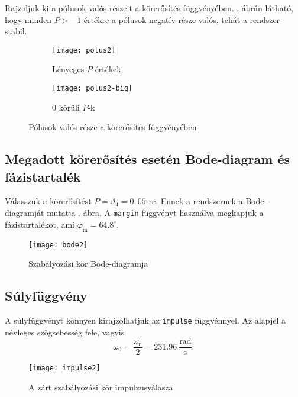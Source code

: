 Rajzoljuk ki a pólusok valós részeit a körerősítés függvényében.
. ábrán látható, hogy minden $P>-1$ értékre a pólusok
negatív része valós, tehát a rendszer stabil.
\begin{figure}[H]
	\centering
	\begin{subfigure}{.49\textwidth}
		\texttt{[image: polus2]}
		\caption{Lényeges $P$ értékek}
	\end{subfigure}
	\begin{subfigure}{.49\textwidth}
		\texttt{[image: polus2-big]}
		\caption{0 körüli $P$-k}
	\end{subfigure}
	\caption{Pólusok valós része a körerősítés függvényében}
	\label{fig:poles2}
\end{figure}


\subsection{Megadott körerősítés esetén Bode-diagram és fázistartalék}

Válasszuk a körerősítést $P=\vartheta_4 = 0,05$-re.
Ennek a rendszernek a Bode-diagramját mutatja . ábra.
A \verb|margin| függvényt használva megkapjuk a fázistartalékot,
ami $\varphi_\text{m}=64.8^\circ$.

\begin{figure}[H]
	\centering
	\texttt{[image: bode2]}
	\caption{Szabályozási kör Bode-diagramja}
	\label{fig:bode2}
\end{figure}


\subsection{Súlyfüggvény}

A súlyfüggvényt könnyen kirajzolhatjuk az \verb|impulse| függvénnyel. Az alapjel
a névleges szögsebesség fele, vagyis
\begin{equation}
	\omega_0 = \frac{\omega_\text{n}}{2} = 231.96~\frac{\text{rad}}{\text{s}}.
\end{equation}

\begin{figure}[H]
	\centering
	\texttt{[image: impulse2]}
	\caption{A zárt szabályozási kör impulzusválasza}
	\label{fig:impulse2}
\end{figure}

